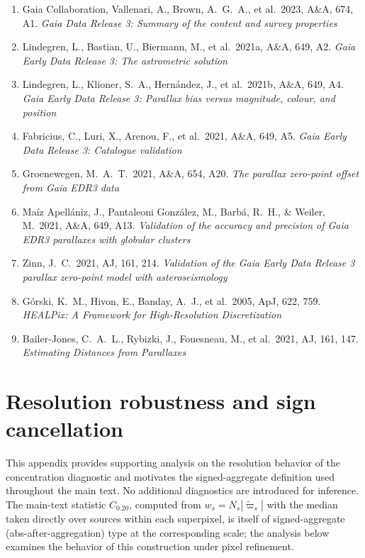 \documentclass{aa}
\begin{document}
\begin{enumerate}
\item Gaia Collaboration, Vallenari, A., Brown, A.~G.~A., et al.\ 2023, A\&A, 674, A1. \textit{Gaia Data Release 3: Summary of the content and survey properties}

\item Lindegren, L., Bastian, U., Biermann, M., et al.\ 2021a, A\&A, 649, A2. \textit{Gaia Early Data Release 3: The astrometric solution}

\item Lindegren, L., Klioner, S.~A., Hern\'andez, J., et al.\ 2021b, A\&A, 649, A4. \textit{Gaia Early Data Release 3: Parallax bias versus magnitude, colour, and position}

\item Fabricius, C., Luri, X., Arenou, F., et al.\ 2021, A\&A, 649, A5. \textit{Gaia Early Data Release 3: Catalogue validation}

\item Groenewegen, M.~A.~T.\ 2021, A\&A, 654, A20. \textit{The parallax zero-point offset from Gaia EDR3 data}

\item Ma\'iz Apell\'aniz, J., Pantaleoni Gonz\'alez, M., Barb\'a, R.~H., \& Weiler, M.\ 2021, A\&A, 649, A13. \textit{Validation of the accuracy and precision of Gaia EDR3 parallaxes with globular clusters}

\item Zinn, J.~C.\ 2021, AJ, 161, 214. \textit{Validation of the Gaia Early Data Release 3 parallax zero-point model with asteroseismology}

\item G\'orski, K.~M., Hivon, E., Banday, A.~J., et al.\ 2005, ApJ, 622, 759. \textit{HEALPix: A Framework for High-Resolution Discretization}

\item Bailer-Jones, C.~A.~L., Rybizki, J., Fouesneau, M., et al.\ 2021, AJ, 161, 147. \textit{Estimating Distances from Parallaxes}
\end{enumerate}
\appendix
\section{Resolution robustness and sign cancellation}
This appendix provides supporting analysis on the resolution behavior of the
concentration diagnostic and motivates the signed-aggregate definition used
throughout the main text. No additional diagnostics are introduced for inference.
The main-text statistic $C_{0.20}$, computed from $w_s = N_s|\tilde{\varpi}_s|$ with the median taken directly over sources within each superpixel, is itself of signed-aggregate (abs-after-aggregation) type at the corresponding scale; the analysis below examines the behavior of this construction under pixel refinement.
\end{document}
